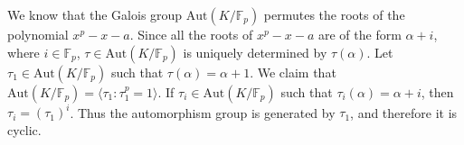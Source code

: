 \documentclass[12pt]{exam}
\theoremstyle{plain} %
\theoremstyle{definition} %
\theoremstyle{remark} %
\begin{document}
\begin{questions}
\begin{solution}
      We know that the Galois group $ \textrm{Aut}(K/\mathbb{F}_p)$
      permutes the roots of the polynomial $x^p - x - a$. Since all the roots
      of $x^p - x - a$ are of the form $\alpha + i$, where $ i \in
      \mathbb{F}_p$, $\tau \in \textrm{Aut}(K/\mathbb{F}_p)$ is
      uniquely determined by $\tau(\alpha)$. Let $\tau_1 \in
      \textrm{Aut}(K/\mathbb{F}_p)$ such that $\tau(\alpha) = \alpha
      + 1$. We claim that $\textrm{Aut}(K/\mathbb{F}_p) = \langle
      \tau_1 : \tau_1^p = 1 \rangle$. If $\tau_i \in \textrm{Aut}(K/
      \mathbb{F}_p)$ such that $\tau_i(\alpha) = \alpha + i$, then
      $\tau_i = (\tau_1)^i$. Thus the automorphism group is generated
      by $\tau_1$, and therefore it is cyclic.
    \end{solution}

  \end{questions}
  \printbibliography[heading=bibintoc]
  
\end{document}
